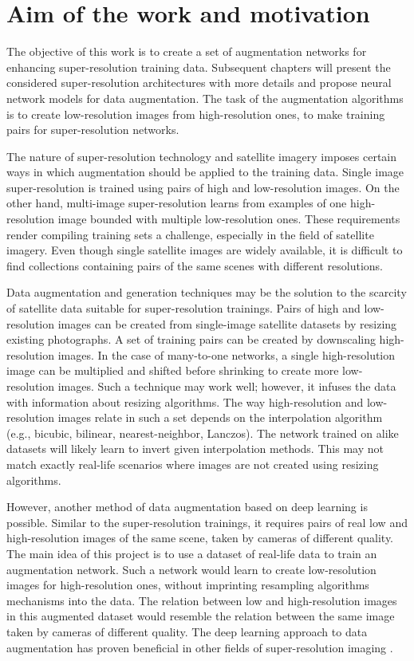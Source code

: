 \section{Aim of the work and motivation}
The objective of this work is to create a set of augmentation networks for
enhancing super-resolution training data.
Subsequent chapters will present the considered super-resolution architectures
with more details and propose neural network models for data augmentation.
The task of the augmentation algorithms is to create low-resolution images from high-resolution ones, to make training pairs for super-resolution networks. 

The nature of super-resolution technology and satellite imagery imposes certain
ways in which augmentation should be applied to the training data.
Single image super-resolution is trained using pairs of high and low-resolution images.
On the other hand, multi-image super-resolution learns from examples of one high-resolution image bounded with multiple low-resolution ones.
These requirements render compiling training sets a challenge, especially in the
field of satellite imagery.
Even though single satellite images are widely available, it is difficult to find collections containing pairs of the same scenes with different resolutions.

Data augmentation and generation techniques may be the solution to the scarcity of satellite data suitable for super-resolution trainings.
Pairs of high and low-resolution images can be created from single-image satellite datasets by resizing existing photographs.
A set of training pairs can be created by downscaling high-resolution images.
In the case of many-to-one networks, a single high-resolution image can be
multiplied and shifted before shrinking to create more low-resolution images.
Such a technique may work well; however, it infuses the data with information
about resizing algorithms.
The way high-resolution and low-resolution images relate in such a set
depends on the interpolation algorithm (e.g., bicubic, bilinear,
nearest-neighbor, Lanczos).
The network trained on alike datasets will likely learn to invert given
interpolation methods.
This may not match exactly real-life scenarios where images are not created
using resizing algorithms.

However, another method of data augmentation based on deep learning is possible.
Similar to the super-resolution trainings, it requires pairs of real low and high-resolution
images of the same scene, taken by cameras of different quality.
The main idea of this project is to use a dataset of real-life data to
train an augmentation network.
Such a network would learn to create low-resolution images for
high-resolution ones, without imprinting resampling algorithms mechanisms into the
data.
The relation between low and high-resolution images in this augmented
dataset would resemble the relation between the same image taken by cameras of
different quality.
The deep learning approach to data augmentation has proven beneficial in other fields of super-resolution imaging \cite{bulat-2018-supergan}.

